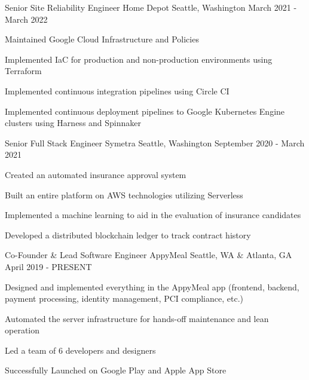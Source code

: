 \begin{cventries}

\cventry
{Senior Site Reliability Engineer} %
{Home Depot} %
{Seattle, Washington} %
{March 2021 - March 2022} %
{ %
\begin{cvitems}
\item {Maintained Google Cloud Infrastructure and Policies}
\item {Implemented IaC for production and non-production environments using Terraform}
\item {Implemented continuous integration pipelines using Circle CI}
\item {Implemented continuous deployment pipelines to Google Kubernetes Engine clusters using Harness and Spinnaker}
\end{cvitems}
}


\cventry
{Senior Full Stack Engineer} %
{Symetra} %
{Seattle, Washington} %
{September 2020 - March 2021} %
{ %
\begin{cvitems}
\item {Created an automated insurance approval system}
\item {Built an entire platform on AWS technologies utilizing Serverless}
\item {Implemented a machine learning to aid in the evaluation of insurance candidates}
\item {Developed a distributed blockchain ledger to track contract history}
\end{cvitems}
}


\cventry
{Co-Founder \& Lead Software Engineer} %
{AppyMeal} %
{Seattle, WA \& Atlanta, GA} %
{April 2019 - PRESENT} %
{ %
\begin{cvitems}
\item {Designed and implemented everything in the AppyMeal app (frontend, backend, payment processing, \newline identity management, PCI compliance, etc.)}
\item {Automated the server infrastructure for hands-off maintenance and lean operation}
\item {Led a team of 6 developers and designers}
\item {Successfully Launched on Google Play and Apple App Store}
\end{cvitems}
}


\end{cventries}
